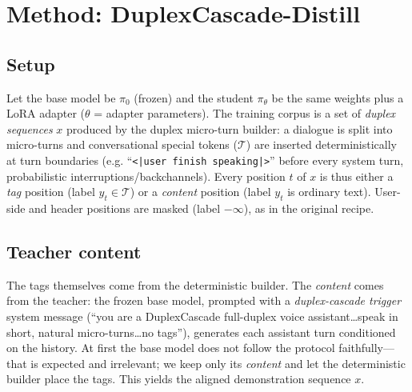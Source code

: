 \documentclass[conference]{IEEEtran}
\begin{document}
\section{Method: DuplexCascade-Distill}
\label{sec:method}
\subsection{Setup}
Let the base model be $\pi_0$ (frozen) and the student $\pi_\theta$ be the same
weights plus a LoRA adapter ($\theta$ = adapter parameters). The training corpus is a
set of \emph{duplex sequences} $x$ produced by the duplex micro-turn builder: a
dialogue is split into micro-turns and conversational special tokens
($\mathcal{T}$) are inserted deterministically at turn boundaries
(e.g. ``\texttt{\textless|user finish speaking|>}'' before every system turn, probabilistic
interruptions/backchannels). Every position $t$ of $x$ is thus either a
\emph{tag} position (label $y_t \in \mathcal{T}$) or a \emph{content} position
(label $y_t$ is ordinary text). User-side and header positions are masked
(label $-\infty$), as in the original recipe.

\subsection{Teacher content}
The tags themselves come from the deterministic builder. The \emph{content} comes
from the teacher: the frozen base model, prompted with a \emph{duplex-cascade trigger}
system message (``you are a DuplexCascade full-duplex voice assistant\ldots speak in
short, natural micro-turns\ldots no tags''), generates each assistant turn
conditioned on the history. At first the base model does not follow the protocol
faithfully---that is expected and irrelevant; we keep only its \emph{content} and
let the deterministic builder place the tags. This yields the aligned demonstration
sequence $x$.
\end{document}
